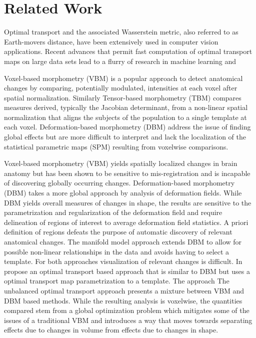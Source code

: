 \documentclass{llncs}
\begin{document}
\section{Related Work}

Optimal transport and the associated Wasserstein metric, also referred to as
Earth-movers distance, have been extensively used in computer vision
applications. Recent advances that permit fast computation of optimal transport
maps on large data sets lead to a flurry of research in machine learning and 

Voxel-based morphometry (VBM) is a popular approach to detect anatomical
changes by comparing, potentially modulated, intensities at each voxel after
spatial normalization. Similarly Tensor-based morphometry (TBM) compares
measures derived, typically the Jacobian determinant, from a non-linear spatial
normalization that aligns the subjects of the population to a single template
at each voxel. Deformation-based morphometry (DBM) address the issue of finding
global effects but are more difficult to interpret and lack the localization of
the statistical parametric maps (SPM) resulting from voxelwise comparisons.


Voxel-based morphometry (VBM) yields spatially localized changes in brain
anatomy but has been shown to be sensitive to mis-registration and is incapable
of discovering globally occurring changes. 
Deformation-based morphometry (DBM) takes a more global approach by analysis of
deformation fields. While DBM yields overall measures of changes in shape, the
results are sensitive to the parametrization and regularization of the
deformation field and require delineation of regions of interest to average
deformation field statistics. A priori definition of regions defeats the
purpose of automatic discovery of relevant anatomical changes. 
The manifold model approach extends DBM to allow for possible non-linear
relationships in the data and avoids having to select a template.
For both approaches visualization of relevant changes is difficult.
In \cite{} propose an optimal transport based approach that is similar to DBM
but uses a optimal transport map parametrization to a template. The approach 
The unbalanced optimal transport approach presents a mixture between VBM and
DBM based methods.  While the resulting analysis is voxelwise, the quantities
compared stem from a global optimization problem which mitigates some of the
issues of a traditional VBM and introduces a way that moves towards separating
effects due to changes in volume from effects due to changes in shape.
\end{document}
